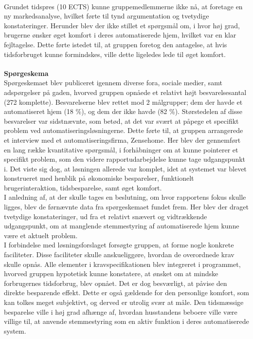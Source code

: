 \\
Grundet tidspres (10 ECTS) kunne gruppemedlemmerne ikke nå, at foretage en ny markedsanalyse, hvilket førte til tynd argumentation og tvetydige konstateringer. Herunder blev der ikke stillet et spørgsmål om, i hvor høj grad, brugerne ønsker øget komfort i deres automatiserede hjem, hvilket var en klar fejltagelse. Dette førte istedet til, at gruppen foretog den antagelse, at hvis tidsforbruget kunne formindskes, ville dette ligeledes lede til øget komfort.
\\\\
{\bf Spørgeskema}\\
Spørgeskemaet blev publiceret igennem diverse fora, sociale medier, samt adspørgelser på gaden, hvorved gruppen opnåede et relativt højt besvarelsesantal (272 komplette). Besvarelserne blev rettet mod 2 målgrupper; dem der havde et automatiseret hjem (18 \%), og dem der ikke havde (82 \%). Størstedelen af disse besvarelser var sidstnævnte, som betød, at det var svært at påpege et specifikt problem ved automatiseringsløsningerne. Dette førte til, at gruppen arrangerede et interview med et automatiseringsfirma, Zensehome. Her blev der gennemført en lang række kvantitative spørgsmål, i forhåbninger om at kunne pointerer et specifikt problem, som den videre rapportudarbejdelse kunne tage udgangspunkt i. Det viste sig dog, at løsningen allerede var komplet, idet at systemet var blevet konstrueret med henblik på økonomiske besparelser, funktionelt brugerinteraktion, tidsbesparelse, samt øget komfort.\\
I anledning af, at der skulle tages en beslutning, om hvor rapportens fokus skulle ligges, blev de førnævnte data fra spørgeskemaet fundet frem. Her blev der draget tvetydige konstateringer, ud fra et relativt snævert og vidtrækkende udgangspunkt, om at manglende stemmestyring af automatiserede hjem kunne være et aktuelt problem.\\
I forbindelse med løsningsforslaget forsøgte gruppen, at forme nogle konkrete faciliteter. Disse faciliteter skulle anskueliggøre, hvordan de overordnede krav skulle opnås. Alle elementer i kravspecifikationen blev integreret i programmet, hvorved gruppen hypotetisk kunne konstatere, at ønsket om at mindske forbrugernes tidsforbrug, blev opnået. Det er dog besværligt, at påvise den direkte besparende effekt. Dette er også gældende for den personlige komfort, som kan tolkes meget subjektivt, og derved er utrolig svær at måle. Den tidsmæssige besparelse ville i høj grad afhænge af, hvordan husstandens beboere ville være villige til, at anvende stemmestyring som en aktiv funktion i deres automatiserede system.

